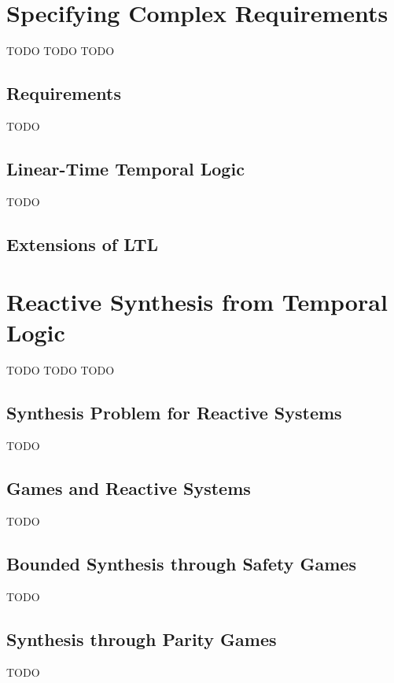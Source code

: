 \section{Specifying Complex Requirements}
TODO TODO TODO

\subsection{Requirements}
TODO

\subsection{Linear-Time Temporal Logic}
TODO

\subsection{Extensions of LTL}

\section{Reactive Synthesis from Temporal Logic}
TODO TODO TODO

\subsection{Synthesis Problem for Reactive Systems}
TODO

\subsection{Games and Reactive Systems}
TODO

\subsection{Bounded Synthesis through Safety Games}
TODO

\subsection{Synthesis through Parity Games}
TODO